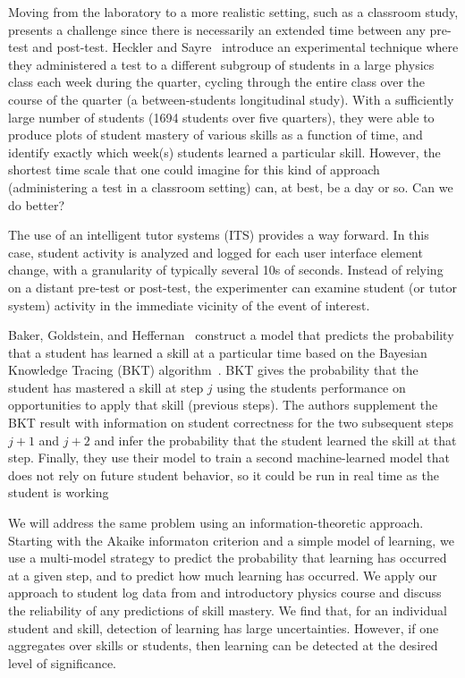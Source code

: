 \documentclass{edm_template}
\begin{document}
Moving from the laboratory to a more realistic setting, such as a
classroom study, presents a challenge since there is necessarily an
extended time between any pre-test and post-test.  Heckler and 
Sayre~\citeyear{heckler_what_2010} introduce an experimental technique
where they administered a test to a different subgroup of students in
a large physics class each week during the quarter, cycling through
the entire class over the course of the quarter (a
between-students longitudinal study).  With a sufficiently large number
of students (1694 students over five quarters), they were able to produce
plots of student mastery of various skills as a function of time, and
identify exactly which week(s) students learned a particular skill.
However, the shortest time scale that one could imagine for this
kind of approach (administering a test in a classroom setting) can, at
best, be a day or so.  Can we do better?

The use of an intelligent tutor systems (ITS) provides a way forward.
In this case, student activity is
analyzed and logged for each user interface element change, with a
granularity of typically several 10s of seconds.  Instead of relying
on a distant pre-test or post-test, the experimenter can examine
student (or tutor system) activity in the immediate vicinity of the
event of interest.

Baker, Goldstein, and Heffernan~\citeyear{baker_detecting_2011}
construct a model that predicts the probability that a student has
learned a skill at a particular time based on the Bayesian Knowledge
Tracing (BKT) algorithm~\cite{corbett_knowledge_1995}.  BKT gives
the probability that the student has mastered a skill at step $j$
using the students performance on opportunities to apply that skill
(previous steps).  The authors supplement the BKT result with
information on student correctness for the two subsequent steps $j+1$
and $j+2$ and infer the probability that the student learned
the skill at that step.  Finally, they use their model to train a
second machine-learned model that does not rely on future student behavior,
so it could be run in real time as the student is working

We will address the same problem using an information-theoretic approach.
Starting with the Akaike informaton criterion and a simple model of
learning, we use a multi-model strategy to predict the probability that 
learning has occurred at a given step, and to predict how much
learning has occurred.  We apply our approach to student log data from
and introductory physics course and discuss the reliability of any
predictions of skill mastery.  We find that, for an individual
student and skill, detection of learning has large uncertainties.
However, if one aggregates over skills or students, then learning can
be detected at the desired level of significance.
\end{document}
